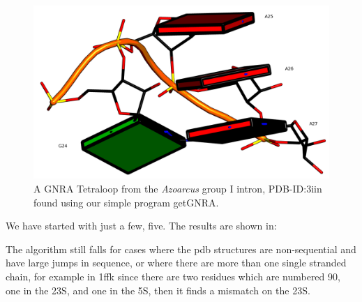 \begin{figure}
\centering 
\includegraphics[angle=0, scale=2]{Chapter5/gnra24.png}
\caption{A GNRA Tetraloop from the \textit{Azoarcus} group I intron,
  PDB-ID:3iin  \cite{antonioli2010}  found  using our  simple  program
  getGNRA.}
\end{figure}



We have started with just a few, five. The results are shown in:

The  algorithm still  falls for  cases  where the  pdb structures  are
non-sequential and  have large jumps  in sequence, or where  there are
more than one  single stranded chain, for example  in 1ffk since there
are two residues which are numbered 90, one in the 23S, and one in the
5S, then it finds a mismatch on the 23S.





